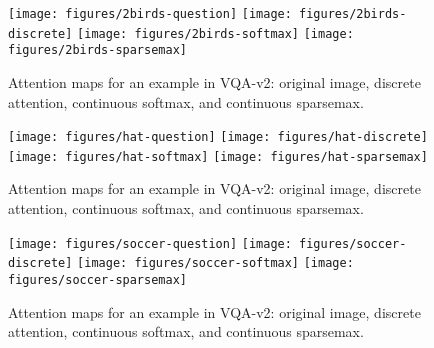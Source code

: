 \documentclass{article}
\begin{document}
\begin{figure*}[t]
\centering
\texttt{[image: figures/2birds-question]}
\texttt{[image: figures/2birds-discrete]}
\texttt{[image: figures/2birds-softmax]}
\texttt{[image: figures/2birds-sparsemax]}
\caption{\label{fig:examples_vqa_2birds}Attention maps for an example in VQA-v2: original image, discrete attention, continuous softmax, and continuous sparsemax.}
\end{figure*}



\begin{figure*}[t]
\centering
\texttt{[image: figures/hat-question]}
\texttt{[image: figures/hat-discrete]}
\texttt{[image: figures/hat-softmax]}
\texttt{[image: figures/hat-sparsemax]}
\caption{\label{fig:examples_vqa_hat}Attention maps for an example in VQA-v2: original image, discrete attention, continuous softmax, and continuous sparsemax.}
\end{figure*}



\begin{figure*}[t]
\centering
\texttt{[image: figures/soccer-question]}
\texttt{[image: figures/soccer-discrete]}
\texttt{[image: figures/soccer-softmax]}
\texttt{[image: figures/soccer-sparsemax]}
\caption{\label{fig:examples_vqa_soccer}Attention maps for an example in VQA-v2: original image, discrete attention, continuous softmax, and continuous sparsemax.}
\end{figure*}
\end{document}
